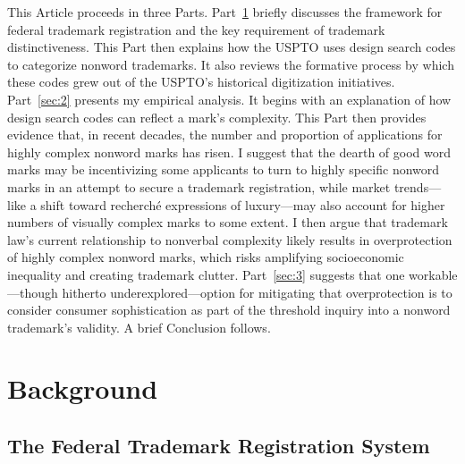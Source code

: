 \documentclass[letterpaper, 11pt, oneside]{article}
\begin{document}
This Article proceeds in three Parts. Part~\ref{sec:1} briefly discusses the framework for federal trademark registration and the key requirement of trademark distinctiveness. This Part then explains how the USPTO uses design search codes to categorize nonword trademarks. It also reviews the formative process by which these codes grew out of the USPTO's historical digitization initiatives. Part~\ref{sec:2} presents my empirical analysis. It begins with an explanation of how design search codes can reflect a mark's complexity. This Part then provides evidence that, in recent decades, the number and proportion of applications for highly complex nonword marks has risen. I suggest that the dearth of good word marks may be incentivizing some applicants to turn to highly specific nonword marks in an attempt to secure a trademark registration, while market trends—like a shift toward recherché expressions of luxury—may also account for higher numbers of visually complex marks to some extent. I then argue that trademark law's current relationship to nonverbal complexity likely results in overprotection of highly complex nonword marks, which risks amplifying socioeconomic inequality and creating trademark clutter. Part~\ref{sec:3} suggests that one workable—though hitherto underexplored—option for mitigating that overprotection is to consider consumer sophistication as part of the threshold inquiry into a nonword trademark's validity. A brief Conclusion follows.

\newpage

\section{Background}\label{sec:1}

\subsection{The Federal Trademark Registration System}\label{subsec:1A}
\end{document}
